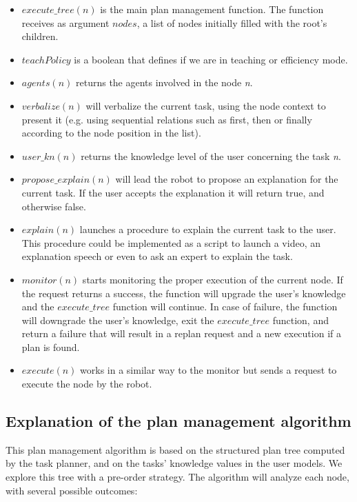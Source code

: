 \begin{itemize}
\item \textit{$execute\_tree(n)$} is the main plan management function. The function receives as argument \textit{$nodes$}, a list of nodes initially filled with the root's children.
\item \textit{$teachPolicy$} is a boolean that defines if we are in teaching or efficiency mode.
\item \textit{$agents(n)$} returns the agents involved in the node \textit{n}.
\item \textit{$verbalize(n)$} will verbalize the current task, using the node context to present it (e.g. using sequential relations such as first, then or finally according to the node position in the list).
\item \textit{$user\_kn(n)$} returns the knowledge level of the user concerning the task \textit{n}.
\item \textit{$propose\_explain(n)$} will lead the robot to propose an explanation for the current task. If the user accepts the explanation it will return true, and otherwise false.
\item \textit{$explain(n)$} launches a procedure to explain the current task to the user. This procedure could be implemented as a script to launch a video, an explanation speech or even to ask an expert to explain the task.
\item \textit{$monitor(n)$} starts monitoring the proper execution of the current node. If the request returns a success, the function will upgrade the user's knowledge and the \textit{$execute\_tree$} function will continue. In case of failure, the function will downgrade the user's knowledge, exit the \textit{$execute\_tree$} function, and return a failure that will result in a replan request and a new execution if a plan is found.
\item \textit{$execute(n)$} works in a similar way to the monitor but sends a request to execute the node by the robot.
\end{itemize}
 
\subsection{Explanation of the plan management algorithm}
This plan management algorithm is based on the structured plan tree computed by the task planner, and on the tasks' knowledge values in the user models. We explore this tree with a pre-order strategy. The algorithm will analyze each node, with several possible outcomes:

